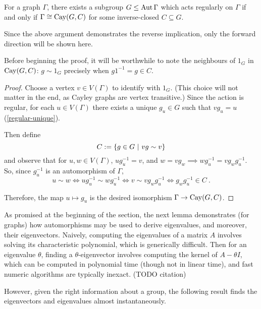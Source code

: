 \documentclass{report}
\begin{document}
    \begin{lem}\label{regular-aut-cayley}
      For a graph $\Gamma$, there exists a subgroup $G \leq \operatorname{Aut} \Gamma$
      which acts regularly on $\Gamma$
      if and only if $\Gamma \cong \operatorname{Cay}(G, C)$
      for some inverse-closed $C \subseteq G$.
    \end{lem}

    Since the above argument demonstrates the reverse implication,
    only the forward direction will be shown here.

    Before beginning the proof, it will be worthwhile to note the neighbours
    of $1_G$ in $\operatorname{Cay}(G, C)$: $g \sim 1_G$ precisely when $g1^{-1} = g \in C$.

    \begin{proof}
      Choose a vertex $v \in V(\Gamma)$ to identify with $1_G$.  (This choice
      will not matter in the end, as Cayley graphs are vertex transitive.)
      Since the action is regular, for each $u \in V(\Gamma)$ there exists a
      unique $g_u \in G$ such that $vg_u = u$ (\ref{regular-unique}).

      Then define
      $$
        C := \left\lbrace  g \in G \ \middle| \ vg \sim v  \right\rbrace
      $$
      and observe that for $u, w \in V(\Gamma)$,
      $u g_u^{-1} = v$, and $w = v g_w \implies w g_u^{-1} = v g_w g_u^{-1}$.
      So, since $g_u^{-1}$ is an automorphism of $\Gamma$,
      $$
        u \sim w
        \iff u g_u^{-1} \sim w g_u^{-1}
        \iff v \sim v g_w g_u^{-1}
        \iff g_w g_u^{-1} \in C
        \ .
      $$

      Therefore, the map $u \mapsto g_u$ is the desired isomorphism $\Gamma \to
      \operatorname{Cay}(G, C)$.
    \end{proof}

    As promised at the beginning of the section, the next lemma demonstrates
    (for graphs) how automorphisms may be used to derive eigenvalues, and
    moreover, their eigenvectors.
    Naively, computing the eigenvalues of a matrix $A$ involves solving its
    characteristic polynomial, which is generically difficult.
    Then for an eigenvalue $\theta$, finding a $\theta$-eigenvector involves
    computing the kernel of $A - \theta I$, which can be computed in polynomial
    time (though not in linear time), and fast numeric algorithms are typically
    inexact.  (TODO citation)

    However, given the right information about a group, the following result
    finds the eigenvectors and eigenvalues almost instantaneously.
\end{document}
